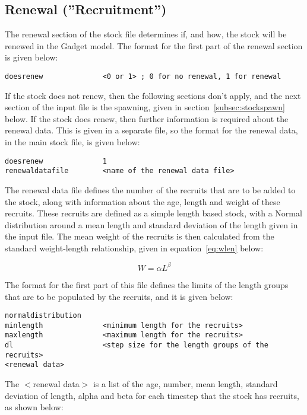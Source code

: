 \documentclass [a4paper, 10pt]{book}
\begin{document}
\subsection{Renewal (''Recruitment'')}\label{subsec:stockrenew}
The renewal section of the stock file determines if, and how, the stock will be renewed in the Gadget model. The format for the first part of the renewal section is given below:

\begin{verbatim}
doesrenew              <0 or 1> ; 0 for no renewal, 1 for renewal
\end{verbatim}

If the stock does not renew, then the following sections don't apply, and the next section of the input file is the spawning, given in section~\ref{subsec:stockspawn} below.  If the stock does renew, then further information is required about the renewal data.  This is given in a separate file, so the format for the renewal data, in the main stock file, is given below:

\begin{verbatim}
doesrenew              1
renewaldatafile        <name of the renewal data file>
\end{verbatim}

The renewal data file defines the number of the recruits that are to be added to the stock, along with information about the age, length and weight of these recruits.  These recruits are defined as a simple length based stock, with a Normal distribution around a mean length and standard deviation of the length given in the input file.  The mean weight of the recruits is then calculated from the standard weight-length relationship, given in equation~\ref{eq:wlen} below:

\begin{equation}\label{eq:wlen}
W = \alpha L ^\beta
\end{equation}

\bigskip
The format for the first part of this file defines the limits of the length groups that are to be populated by the recruits, and it is given below:

\begin{verbatim}
normaldistribution
minlength              <minimum length for the recruits>
maxlength              <maximum length for the recruits>
dl                     <step size for the length groups of the recruits>
<renewal data>
\end{verbatim}

The $<$renewal data$>$ is a list of the age, number, mean length, standard deviation of length, alpha and beta for each timestep that the stock has recruits, as shown below:
\end{document}
